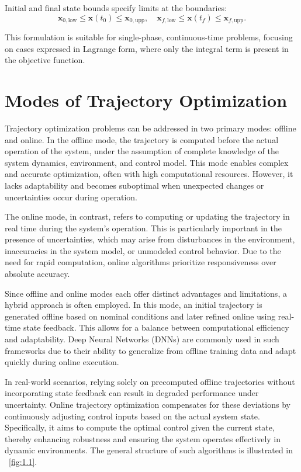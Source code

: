Initial and final state bounds specify limits at the boundaries:
\[
\mathbf{x}_{0,\text{low}} \leq \mathbf{x}(t_0) \leq \mathbf{x}_{0,\text{upp}}, \quad 
\mathbf{x}_{f,\text{low}} \leq \mathbf{x}(t_f) \leq \mathbf{x}_{f,\text{upp}}.
\]

This formulation is suitable for single-phase, continuous-time problems, focusing on cases expressed in Lagrange form, where only the integral term is present in the objective function.


\section{Modes of Trajectory Optimization}

Trajectory optimization problems can be addressed in two primary modes: offline and online. In the offline mode, the trajectory is computed before the actual operation of the system, under the assumption of complete knowledge of the system dynamics, environment, and control model. This mode enables complex and accurate optimization, often with high computational resources. However, it lacks adaptability and becomes suboptimal when unexpected changes or uncertainties occur during operation.

The online mode, in contrast, refers to computing or updating the trajectory in real time during the system's operation. This is particularly important in the presence of uncertainties, which may arise from disturbances in the environment, inaccuracies in the system model, or unmodeled control behavior. Due to the need for rapid computation, online algorithms prioritize responsiveness over absolute accuracy.

Since offline and online modes each offer distinct advantages and limitations, a hybrid approach is often employed. In this mode, an initial trajectory is generated offline based on nominal conditions and later refined online using real-time state feedback. This allows for a balance between computational efficiency and adaptability. Deep Neural Networks (DNNs) are commonly used in such frameworks due to their ability to generalize from offline training data and adapt quickly during online execution.

In real-world scenarios, relying solely on precomputed offline trajectories without incorporating state feedback can result in degraded performance under uncertainty. Online trajectory optimization compensates for these deviations by continuously adjusting control inputs based on the actual system state. Specifically, it aims to compute the optimal control given the current state, thereby enhancing robustness and ensuring the system operates effectively in dynamic environments. The general structure of such algorithms is illustrated in \figurename~\ref{fig:1.1}.


